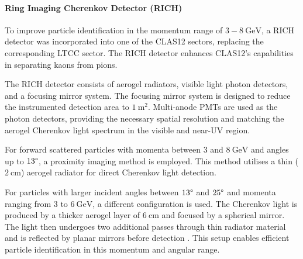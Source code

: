 \paragraph{Ring Imaging Cherenkov Detector (RICH)}
    To improve particle identification in the momentum range of $3 - 8 ~\text{GeV}$, a RICH detector was incorporated into one of the CLAS12 sectors, replacing the corresponding LTCC sector.
    The RICH detector enhances CLAS12's capabilities in separating kaons from pions.

    The RICH detector consists of aerogel radiators, visible light photon detectors, and a focusing mirror system.
    The focusing mirror system is designed to reduce the instrumented detection area to $1 ~\text{m}^2$.
    Multi-anode PMTs are used as the photon detectors, providing the necessary spatial resolution and matching the aerogel Cherenkov light spectrum in the visible and near-UV region.

    For forward scattered particles with momenta between $3$ and $8 ~\text{GeV}$ and angles up to $13\degree$, a proximity imaging method is employed.
    This method utilises a thin ($2 ~\text{cm}$) aerogel radiator for direct Cherenkov light detection.

    For particles with larger incident angles between $13\degree$ and $25\degree$ and momenta ranging from $3$ to $6 ~\text{GeV}$, a different configuration is used.
    The Cherenkov light is produced by a thicker aerogel layer of $6 ~\text{cm}$ and focused by a spherical mirror.
    The light then undergoes two additional passes through thin radiator material and is reflected by planar mirrors before detection \cite{contalbrigo2020}.
    This setup enables efficient particle identification in this momentum and angular range.
